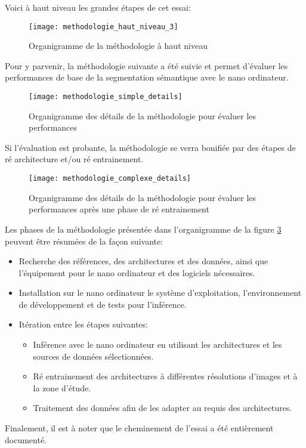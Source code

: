 ﻿\noindent Voici à haut niveau les grandes étapes de cet essai:
\label{methodologie_haut_niveau}
\begin{figure}[H]
    \centering
    \texttt{[image: methodologie\_haut\_niveau\_3]}
    \caption{Organigramme de la méthodologie à haut niveau}
    \label{fig:methodologie_haut_niveau}
\end{figure}
\noindent Pour y parvenir, la méthodologie suivante a été suivie et permet d'évaluer les performances de base de la segmentation sémantique avec le nano ordinateur.
\label{methodologie_simple_details}
\begin{figure}[H]
    \centering
    \texttt{[image: methodologie\_simple\_details]}
    \caption{Organigramme des détails de la méthodologie pour évaluer les performances}
    \label{fig:methodologie_simple_details}
\end{figure}
\noindent Si l'évaluation est probante, la méthodologie se verra bonifiée par des étapes de ré architecture et/ou ré entrainement. 
\label{methodologie_complexe_details}
\begin{figure}[H]
    \centering
    \texttt{[image: methodologie\_complexe\_details]}
    \caption{Organigramme des détails de la méthodologie pour évaluer les performances après une phase de ré entrainement}
    \label{fig:methodologie_complexe_details}
\end{figure}
\noindent Les phases de la méthodologie présentée dans l'organigramme de la figure \ref{fig:methodologie_complexe_details} peuvent être résumées de la façon suivante:
\begin{itemize}
   \item Recherche des références, des architectures et des données, ainsi que l'équipement pour le nano ordinateur et des logiciels nécessaires.
   \item Installation sur le nano ordinateur le système d'exploitation, l'environnement de développement et de tests pour l'inférence.
   \item Itération entre les étapes suivantes:
   \begin{itemize}
      \item Inférence avec le nano ordinateur en utilisant les architectures et les sources de données sélectionnées.
      \item Ré entrainement des architectures à différentes résolutions d'images et à la zone d'étude.
      \item Traitement des données afin de les adapter au requis des architectures.
   \end{itemize}
\end{itemize}
\vspace{\baselineskip}
\noindent Finalement, il est à noter que le cheminement de l'essai a été entièrement documenté.
